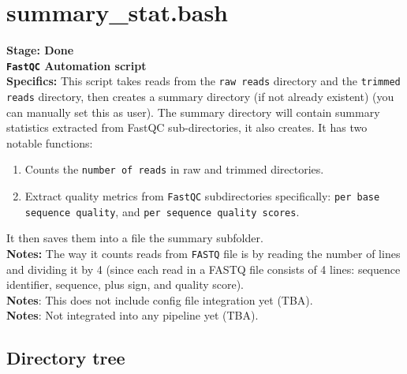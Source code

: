 \documentclass[11pt]{report}
\begin{document}
{\section{summary\_stat.bash}
\textbf{Stage: Done} \\   
\textbf{\texttt{FastQC} Automation script} \\
\textbf{Specifics:} This script takes reads from the \texttt{raw reads} directory and the \texttt{trimmed reads} directory, then creates a summary directory (if not already existent) (you can manually set this as user). The summary directory will contain summary statistics extracted from FastQC sub-directories, it also creates. It has two notable functions: \begin{enumerate}
	\item Counts the \texttt{number of reads} in raw and trimmed directories.  
	\item Extract quality metrics from \texttt{FastQC} subdirectories specifically: \texttt{per base sequence quality}, and \texttt{per sequence quality scores}.
\end{enumerate} 
It then saves them into a file the summary subfolder.  \\
\textbf{Notes:} The way it counts reads from \texttt{FASTQ} file is by reading the number of lines and dividing it by 4 (since each read in a FASTQ file consists of 4 lines: sequence identifier, sequence, plus sign, and quality score). \\
\textbf{Notes}: This does not include config file integration yet (TBA). \\ 
\textbf{Notes}: Not integrated into any pipeline yet (TBA). 

\subsection{Directory tree}



}
\end{document}
